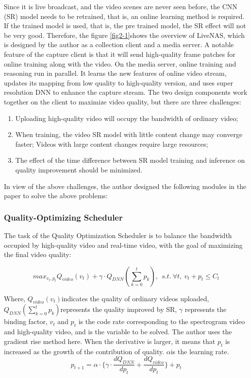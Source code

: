 \documentclass[conference]{IEEEtran}
\begin{document}
Since it is live broadcast, and the video scenes are never seen before, the CNN (SR) model needs to be retrained, that is, an online learning method is required. If the trained model is used, that is, the pre trained model, the SR effect will not be very good. Therefore, the figure \ref{fig2-1}shows the overview of LiveNAS, which is designed by the author as a collection client and a media server. A notable feature of the capture client is that it will send high-quality frame patches for online training along with the video. On the media server, online training and reasoning run in parallel. It learns the new features of online video stream, updates its mapping from low quality to high-quality version, and uses super resolution DNN to enhance the capture stream. The two design components work together on the client to maximize video quality, but there are three challenges:

\begin{enumerate}
    \item Uploading high-quality video will occupy the bandwidth of ordinary video;
    \item When training, the video SR model with little content change may converge faster; Videos with large content changes require large resources;
    \item The effect of the time difference between SR model training and inference on quality improvement should be minimized.
\end{enumerate}

In view of the above challenges, the author designed the following modules in the paper to solve the above problems:

\subsubsection{Quality-Optimizing Scheduler}\quad

The task of the Quality Optimization Scheduler is to balance the bandwidth occupied by high-quality video and real-time video, with the goal of maximizing the final video quality:

\begin{equation}
    max_{v_t,p_t}Q_{video}(v_t)+\gamma \cdot Q_{DNN}(\sum_{k=0}^t p_k),\ \ s.t.\ \forall t, \ v_t+p_t\leq C_t
\end{equation}

Where, $Q_ {video}(v_t)$indicates the quality of ordinary videos uploaded, $Q_{DNN}(\sum_ {k=0}^tp_k)$represents the quality improved by SR, $\gamma$ represents the binding factor, $v_t$ and $p_t$ is the code rate corresponding to the spectrogram video and high-quality video, and is the variable to be solved. The author uses the gradient rise method here. When the derivative is larger, it means that $p_t$ is increased as the growth of the contribution of quality. $\alpha $is the learning rate.
\begin{equation}
    p_{t+1}=\alpha\cdot\{\gamma\cdot\frac{dQ_{DNN}}{dp_t}+\frac{dQ_{video}}{dp_t} \}+p_t
\end{equation}
\end{document}
